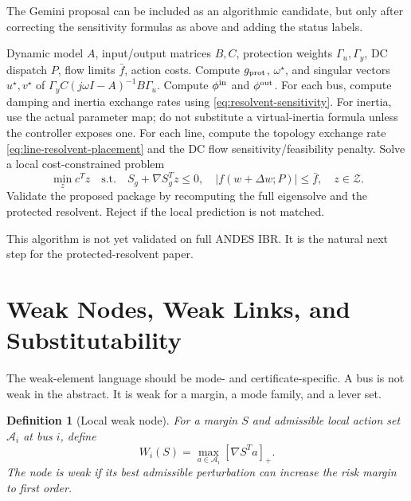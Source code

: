 \documentclass[11pt]{article}
\newtheorem{definition}{Definition}
\begin{document}
The Gemini proposal can be included as an algorithmic candidate, but only after
correcting the sensitivity formulas as above and adding the status labels.

\begin{algorithm}[h]
\caption{Flow-feasible protected-resolvent retrofitting}
\begin{algorithmic}[1]
\REQUIRE Dynamic model $A$, input/output matrices $B,C$, protection weights
$\Gamma_u,\Gamma_y$, DC dispatch $P$, flow limits $\bar f$, action costs.
\STATE Compute $g_{\rm prot}$, $\omega^\star$, and singular vectors
$u^\star,v^\star$ of $\Gamma_y C(j\omega I-A)^{-1}B\Gamma_u$.
\STATE Compute $\phi^{\rm in}$ and $\phi^{\rm out}$.
\STATE For each bus, compute damping and inertia exchange rates using
\eqref{eq:resolvent-sensitivity}. For inertia, use the actual parameter map;
do not substitute a virtual-inertia formula unless the controller exposes one.
\STATE For each line, compute the topology exchange rate
\eqref{eq:line-resolvent-placement} and the DC flow sensitivity/feasibility
penalty.
\STATE Solve a local cost-constrained problem
\[
  \min_z c^Tz\quad
  \text{s.t.}\quad
  S_g+\nabla S_g^Tz\le0,\quad
  |f(w+\Delta w;P)|\le\bar f,\quad z\in\mathcal Z.
\]
\STATE Validate the proposed package by recomputing the full eigensolve and
the protected resolvent. Reject if the local prediction is not matched.
\end{algorithmic}
\end{algorithm}

This algorithm is not yet validated on full ANDES IBR. It is the natural next
step for the protected-resolvent paper.

\section{Weak Nodes, Weak Links, and Substitutability}

The weak-element language should be mode- and certificate-specific. A bus is
not weak in the abstract. It is weak for a margin, a mode family, and a lever
set.

\begin{definition}[Local weak node]
For a margin $S$ and admissible local action set $\mathcal A_i$ at bus $i$,
define
\begin{equation}
  W_i(S)=\max_{a\in\mathcal A_i}
  \left[\nabla S^T a\right]_+ .
  \label{eq:weak-node}
\end{equation}
The node is weak if its best admissible perturbation can increase the risk
margin to first order.
\end{definition}
\end{document}
